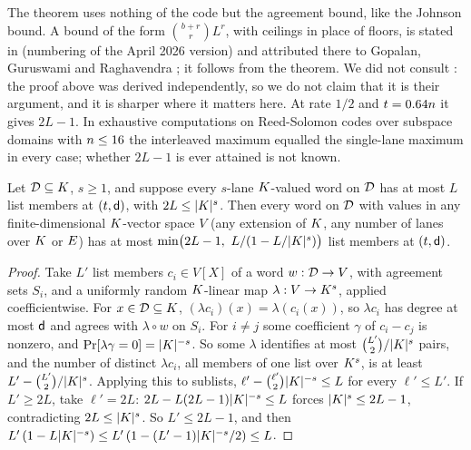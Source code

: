 The theorem uses nothing of the code but the agreement bound, like the Johnson bound. A bound of the form $\binom{b+r}{r}L^r$, with ceilings in place of floors, is stated in \cite[Lemma~2.10]{ABF26} (numbering of the April 2026 version) and attributed there to Gopalan, Guruswami and Raghavendra \cite{GGR11}; it follows from the theorem. We did not consult \cite{GGR11}: the proof above was derived independently, so we do not claim that it is their argument, and it is sharper where it matters here. At rate $1/2$ and $t=0.64n$ it gives $2L-1$. In exhaustive computations on Reed-Solomon codes over subspace domains with $n\le16$ the interleaved maximum equalled the single-lane maximum in every case; whether $2L-1$ is ever attained is not known.

\begin{proposition}\label{prop:R2}
Let $\mathcal{D}\subseteq K$, $s\ge1$, and suppose every $s$-lane $K$-valued word on $\mathcal{D}$ has at most $L$ list members at $(t,\mathsf{d})$, with $2L\le|K|^s$. Then every word on $\mathcal{D}$ with values in any finite-dimensional $K$-vector space $V$ (any extension of $K$, any number of lanes over $K$ or $E$) has at most $\min\bigl(2L-1,\ L/(1-L/|K|^s)\bigr)$ list members at $(t,\mathsf{d})$.
\end{proposition}
\begin{proof}
Take $L'$ list members $c_i\in V[X]$ of a word $w:\mathcal{D}\to V$, with agreement sets $S_i$, and a uniformly random $K$-linear map $\lambda:V\to K^s$, applied coefficientwise. For $x\in\mathcal{D}\subseteq K$, $(\lambda c_i)(x)=\lambda(c_i(x))$, so $\lambda c_i$ has degree at most $\mathsf{d}$ and agrees with $\lambda\circ w$ on $S_i$. For $i\ne j$ some coefficient $\gamma$ of $c_i-c_j$ is nonzero, and $\Pr[\lambda\gamma=0]=|K|^{-s}$. So some $\lambda$ identifies at most $\binom{L'}{2}/|K|^s$ pairs, and the number of distinct $\lambda c_i$, all members of one list over $K^s$, is at least $L'-\binom{L'}{2}/|K|^s$. Applying this to sublists, $\ell'-\binom{\ell'}{2}|K|^{-s}\le L$ for every $\ell'\le L'$. If $L'\ge2L$, take $\ell'=2L$: $2L-L(2L-1)|K|^{-s}\le L$ forces $|K|^s\le2L-1$, contradicting $2L\le|K|^s$. So $L'\le2L-1$, and then $L'\,(1-L|K|^{-s})\le L'\,(1-(L'-1)|K|^{-s}/2)\le L$.
\end{proof}


